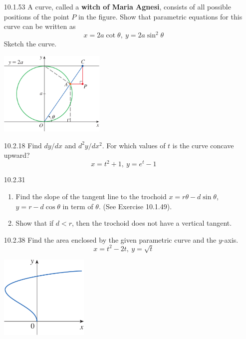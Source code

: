 \documentclass{article}
\begin{document}
\begin{enumerate}
    \newpage

\item[10.1.53]
    A curve, called a \textbf{witch of Maria Agnesi}, consists of all possible
    positions of the point $P$ in the figure. Show that parametric
    equations for this curve can be written as
    \[x=2a\cot{\theta},\ y=2a\sin^{2}{\theta}\]
    Sketch the curve.

    \begin{center}
        \includegraphics[height=4cm]{./png/10.1.53.png}
    \end{center}

\vspace{4cm}

\item[10.2.18]
    Find $dy/dx$ and $d^{2}y/dx^{2}$. For which values of $t$ is the curve concave upward?
    \[x=t^2+1,\ y=e^{t}-1\]

\vspace{4cm}

\item[10.2.31]
    \begin{enumerate}
        \item Find the slope of the tangent line to the trochoid $x=r\theta-d\sin{\theta}$,
            $y=r-d\cos{\theta}$ in term of $\theta$. (See Exercise 10.1.49).
        \item Show that if $d < r$, then the trochoid does not have a vertical tangent.
    \end{enumerate}

\newpage

\item[10.2.38]
    Find the area enclosed by the given parametric curve and the $y$-axis.
    \[x = t^2 - 2t ,\ y=\sqrt{t}\]

    \begin{center}
        \includegraphics[height=4cm]{./png/10.2.38.png}
    \end{center}


\end{enumerate}
\end{document}

